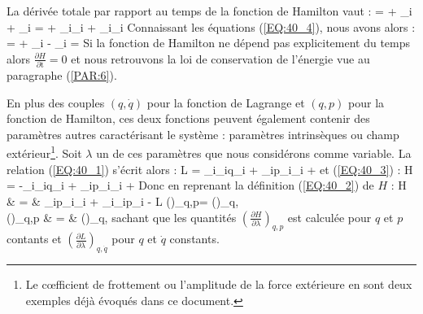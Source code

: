 La d\'{e}riv\'{e}e totale par rapport au temps de la fonction de Hamilton vaut :
\benn
	 =  + \sum_{i} + \sum_{i} =  + \sum_{i}_{i} + \sum_{i}_{i}
\eenn
Connaissant les \'{e}quations (\ref{EQ:40_4}), nous avons alors :
\be
	 =  + \sum_{i} - \sum_{i} =  \label{EQ:40_5}
\ee
Si la fonction de Hamilton ne d\'{e}pend pas explicitement du temps alors $\frac{\partial H}{\partial\mathrm{t}} = 0$ et nous retrouvons la loi de conservation de l'\'{e}nergie vue au paragraphe (\ref{PAR:6}).

En plus des couples $(q,\dot{q})$ pour la fonction de Lagrange et $(q,p)$ pour la fonction de Hamilton, ces deux fonctions peuvent \'{e}galement contenir des param\`{e}tres autres caract\'{e}risant le syst\`{e}me : param\`{e}tres intrins\`{e}ques ou champ ext\'{e}rieur\footnote{Le c{\oe}fficient de frottement ou l'amplitude de la force ext\'{e}rieure en sont deux exemples d\'{e}j\`{a} \'{e}voqu\'{e}s dans ce document.}. Soit $\lambda$ un de ces param\`{e}tres que nous consid\'{e}rons comme variable. La relation (\ref{EQ:40_1}) s'\'{e}crit alors :
\benn
	L = \sum_{i}_{i}q_{i} + \sum_{i}p_{i}_{i} + \lambda
\eenn
et (\ref{EQ:40_3}) :
\benn
	H = -\sum_{i}_{i}q_{i} + \sum_{i}p_{i}_{i} + \lambda
\eenn
Donc en reprenant la d\'{e}finition (\ref{EQ:40_2}) de $H$ :
\bea
	H & = & \sum_{i}p_{i}_{i} + \sum_{i}_{i}p_{i} - L \Leftrightarrow \left(\right)_{q,p}\lambda = \left(\right)_{q,}\lambda \nonumber \\
	\Leftrightarrow \left(\right)_{q,p} & = & \left(\right)_{q,} \label{EQ:40_6}
\eea
sachant que les quantit\'{e}s $\left(\frac{\partial H}{\partial\lambda}\right)_{q,p}$ est calcul\'{e}e pour $q$ et $p$ contants et $\left(\frac{\partial L}{\partial\lambda}\right)_{q,\dot{q}}$ pour $q$ et $\dot{q}$ constants.

